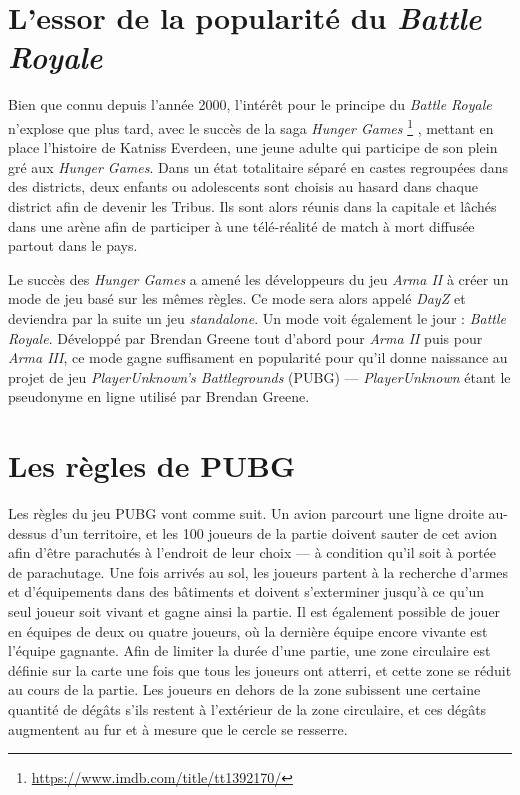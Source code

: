 \section{L'essor de la popularité du \emph{Battle Royale}}
Bien que connu depuis l'ann\'ee 2000, l'intérêt pour le principe du \emph{Battle Royale} n'explose que plus tard, avec le succès de la saga \emph{Hunger Games}%
%
\footnote{\url{https://www.imdb.com/title/tt1392170/}}
%
, mettant en place l'histoire de Katniss Everdeen, une jeune adulte qui participe de son plein gré aux \emph{Hunger Games}. Dans un état totalitaire séparé en castes regroupées dans des districts, deux enfants ou adolescents sont choisis au hasard dans chaque district afin de devenir les Tribus. Ils sont alors réunis dans la capitale et lâchés dans une arène afin de participer à une télé-réalité de match à mort diffusée partout dans le pays.

Le succès des \emph{Hunger Games} a amené les développeurs du jeu \emph{Arma II} à créer un mode de jeu basé sur les mêmes règles. Ce mode sera alors appelé \emph{DayZ} et deviendra par la suite un jeu \emph{standalone}. Un mode voit également le jour : \emph{Battle Royale}. Développé par Brendan Greene tout d'abord pour \emph{Arma II} puis pour \emph{Arma III}, ce mode gagne suffisament en popularité pour qu'il donne naissance au projet de jeu \emph{PlayerUnknown's Battlegrounds} (PUBG) --- \emph{PlayerUnknown} étant le pseudonyme en ligne utilisé par Brendan Greene.

\section{Les règles de PUBG}
Les r\`egles du jeu PUBG vont comme suit.
Un avion parcourt une ligne droite au-dessus d'un territoire, et les 100 joueurs de la partie doivent sauter de cet avion afin d'être parachutés à l'endroit de leur choix --- à condition qu'il soit à portée de parachutage. Une fois arrivés au sol, les joueurs partent à la recherche d'armes et d'équipements dans des bâtiments et doivent s'exterminer jusqu'à ce qu'un seul joueur soit vivant et gagne ainsi la partie. Il est également possible de jouer en \'equipes de deux ou quatre joueurs, o\`u la dernière équipe encore vivante est l'\'equipe gagnante. Afin de limiter la durée d'une partie, une zone circulaire est définie sur la carte une fois que tous les joueurs ont atterri, et cette zone se réduit au cours de la partie. Les joueurs en dehors de la zone subissent une certaine quantité de dégâts s'ils restent \`a l'ext\'erieur de la zone circulaire, et ces dégâts augmentent au fur et à mesure que le cercle se resserre.

